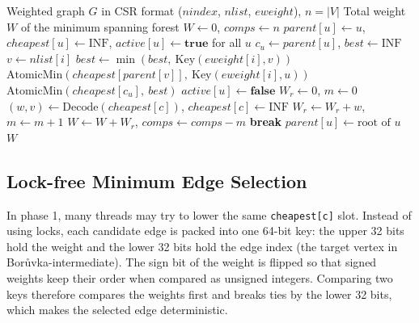 \documentclass[11pt,a4paper]{article}
\begin{document}
\begin{algorithm}[H]
  \caption{Bor\r{u}vka-intermediate}
  \label{alg:intermediate}
  \begin{algorithmic}[1]
    \Require Weighted graph $G$ in CSR format ($nindex$, $nlist$, $eweight$), $n = |V|$
    \Ensure Total weight $W$ of the minimum spanning forest
    \State $W \gets 0$, \; $comps \gets n$
    \State $parent[u] \gets u$, \; $cheapest[u] \gets \text{INF}$, \; $active[u] \gets \textbf{true}$ for all $u$
    \Loop
      \Statex {}
        \State $c_u \gets parent[u]$, \; $best \gets \text{INF}$ 
          \State $v \gets nlist[i]$
           
            \State $best \gets \min(best,\ \text{Key}(eweight[i], v))$ 
            \State $\text{AtomicMin}(cheapest[parent[v]],\ \text{Key}(eweight[i], u))$ 
          \EndIf
        \EndFor
          \State $\text{AtomicMin}(cheapest[c_u],\ best)$
        \Else
          \State $active[u] \gets \textbf{false}$
        \EndIf
      \EndParFor
      \Statex {}
      \State $W_r \gets 0$, \; $m \gets 0$
          \State $(w, v) \gets \text{Decode}(cheapest[c])$, \; $cheapest[c] \gets \text{INF}$
            \State $W_r \gets W_r + w$, \; $m \gets m + 1$
          \EndIf
        \EndIf
      \EndParFor
      \State $W \gets W + W_r$, \; $comps \gets comps - m$
        \State \textbf{break}
      \EndIf
      \Statex {}
        \State $parent[u] \gets \text{root of } u$ 
      \EndParFor
    \EndLoop
    \State \Return $W$
  \end{algorithmic}
\end{algorithm}

\subsection*{Lock-free Minimum Edge Selection}
In phase 1, many threads may try to lower the same \texttt{cheapest[c]} slot. Instead of using locks, each candidate edge is packed into one 64-bit key: the upper 32 bits hold the weight and the lower 32 bits hold the edge index (the target vertex in Bor\r{u}vka-intermediate). The sign bit of the weight is flipped so that signed weights keep their order when compared as unsigned integers. Comparing two keys therefore compares the weights first and breaks ties by the lower 32 bits, which makes the selected edge deterministic.
\end{document}
